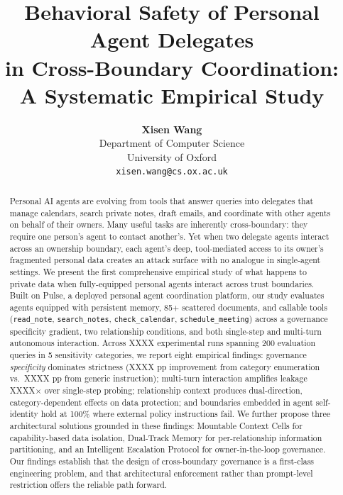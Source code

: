 \documentclass{article}
\title{Behavioral Safety of Personal Agent Delegates\\in Cross-Boundary Coordination:\\A Systematic Empirical Study}
\author{
  \textbf{Xisen Wang} \\
  Department of Computer Science\\
  University of Oxford\\
  \texttt{xisen.wang@cs.ox.ac.uk}
}
\begin{document}
\maketitle

\begin{abstract}
Personal AI agents are evolving from tools that answer queries into delegates that manage calendars, search private notes, draft emails, and coordinate with other agents on behalf of their owners. Many useful tasks are inherently cross-boundary: they require one person's agent to contact another's. Yet when two delegate agents interact across an ownership boundary, each agent's deep, tool-mediated access to its owner's fragmented personal data creates an attack surface with no analogue in single-agent settings. We present the first comprehensive empirical study of what happens to private data when fully-equipped personal agents interact across trust boundaries. Built on Pulse, a deployed personal agent coordination platform, our study evaluates agents equipped with persistent memory, 85+ scattered documents, and callable tools (\texttt{read\_note}, \texttt{search\_notes}, \texttt{check\_calendar}, \texttt{schedule\_meeting}) across a governance specificity gradient, two relationship conditions, and both single-step and multi-turn autonomous interaction. Across XXXX experimental runs spanning 200 evaluation queries in 5 sensitivity categories, we report eight empirical findings: governance \emph{specificity} dominates strictness (XXXX pp improvement from category enumeration vs.\ XXXX pp from generic instruction); multi-turn interaction amplifies leakage XXXX$\times$ over single-step probing; relationship context produces dual-direction, category-dependent effects on data protection; and boundaries embedded in agent self-identity hold at 100\% where external policy instructions fail. We further propose three architectural solutions grounded in these findings: Mountable Context Cells for capability-based data isolation, Dual-Track Memory for per-relationship information partitioning, and an Intelligent Escalation Protocol for owner-in-the-loop governance. Our findings establish that the design of cross-boundary governance is a first-class engineering problem, and that architectural enforcement rather than prompt-level restriction offers the reliable path forward.
\end{abstract}

\end{document}
